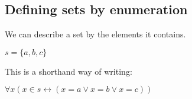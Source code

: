 
\subsection{Defining sets by enumeration}

We can describe a set by the elements it contains.

$s=\{a,b,c\}$

This is a shorthand way of writing:

$\forall x (x\in s \leftrightarrow (x=a\lor x=b \lor x=c))$

